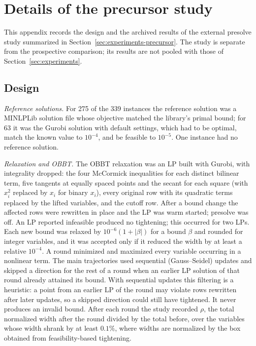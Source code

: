 \section{Details of the precursor study}\label{sec:precursor-details}

This appendix records the design and the archived results of the external
presolve study summarized in Section~\ref{sec:experiments-precursor}. The study
is separate from the prospective comparison; its results are not pooled with
those of Section~\ref{sec:experiments}.

\subsection{Design}

\emph{Reference solutions.} For 275 of the 339 instances the reference solution
was a MINLPLib solution file whose objective matched the library's primal
bound; for 63 it was the Gurobi solution with default settings, which had to be
optimal, match the known value to $10^{-4}$, and be feasible to $10^{-5}$. One
instance had no reference solution.

\emph{Relaxation and OBBT.} The OBBT relaxation was an LP built with Gurobi,
with integrality dropped: the four McCormick inequalities for each distinct
bilinear term, five tangents at equally spaced points and the secant for each
square (with $x_i^2$ replaced by $x_i$ for binary $x_i$), every original row with
its quadratic terms replaced by the lifted variables, and the cutoff row. After
a bound change the affected rows were rewritten in place and the LP was warm
started; presolve was off. An LP reported infeasible produced no tightening; this
occurred for two LPs. Each new bound was relaxed by $10^{-6}(1+|\beta|)$ for a
bound $\beta$ and rounded for integer variables, and it was accepted only if it
reduced the width by at least a relative $10^{-4}$. A round minimized and
maximized every variable occurring in a nonlinear term. The main trajectories
used sequential (Gauss--Seidel) updates and skipped a direction for the rest of a
round when an earlier LP solution of that round already attained its bound.
With sequential updates this filtering is a heuristic: a point from an earlier
LP of the round may violate rows rewritten after later updates, so a skipped
direction could still have tightened. It never produces an invalid bound.
After each round the study recorded $\rho$, the total normalized width after the
round divided by the total before, over the variables whose width shrank by at
least $0.1\%$, where widths are normalized by the box obtained from feasibility-based
tightening.

